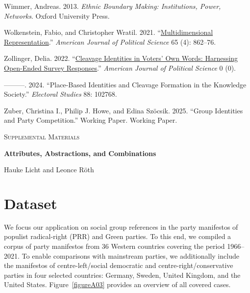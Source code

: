 \documentclass[12pt]{article}
\newlength{\cslhangindent}
\newenvironment{CSLReferences}[2]
  {\begin{list}{}{%
    \setlength{\itemindent}{0pt}
    \setlength{\leftmargin}{0pt}
    \setlength{\parsep}{0pt}
    \ifodd #1
      \setlength{\leftmargin}{\cslhangindent}
      \setlength{\itemindent}{-\cslhangindent}
    \fi
    \setlength{\itemsep}{#2\baselineskip}}}
  {\end{list}}
\begin{document}
\begin{CSLReferences}{1}{0}
Wimmer, Andreas. 2013. \emph{Ethnic Boundary Making: Institutions, Power, Networks}. Oxford University Press.

Wolkenstein, Fabio, and Christopher Wratil. 2021. {``\href{https://doi.org/10.1111/ajps.12563}{Multidimensional Representation}.''} \emph{American Journal of Political Science} 65 (4): 862--76.

Zollinger, Delia. 2022. {``\href{https://doi.org/10.1111/ajps.12743}{Cleavage Identities in Voters' Own Words: Harnessing Open-Ended Survey Responses}.''} \emph{American Journal of Political Science} 0 (0).

---------. 2024. {``Place-Based Identities and Cleavage Formation in the Knowledge Society.''} \emph{Electoral Studies} 88: 102768.

Zuber, Christina I., Philip J. Howe, and Edina Szöcsik. 2025. {``Group Identities and Party Competition.''} Working Paper. Working Paper.

\end{CSLReferences}

\endgroup

\clearpage
\appendix
\setcounter{page}{1}
\begin{center}
\Huge \scshape Supplemental Materials \par
\LARGE \bfseries Attributes, Abstractions, and Combinations \par
\medskip
\Large \normalfont Hauke Licht and Leonce Röth
\bigskip
\end{center}
\vfill
\renewcommand{\contentsname}{Contents}
\startcontents[appendix]
\vfill
\clearpage

\renewcommand\thefigure{\thesection\arabic{figure}}
\renewcommand\thetable{\thesection\arabic{table}}

\section{Dataset}\label{sec-apx_dataset}

We focus our application on social group references in the party manifestos of populist radical-right (PRR) and Green parties.
To this end, we compiled a corpus of party manifestos from 36 Western countries covering the period 1966--2021.
To enable comparisons with mainstream parties, we additionally include the manifestos of centre-left/social democratic and centre-right/conservative parties in four selected countries: Germany, Sweden, United Kingdom, and the United States.
Figure~\ref{figureA03} provides an overview of all covered cases.
\end{document}
